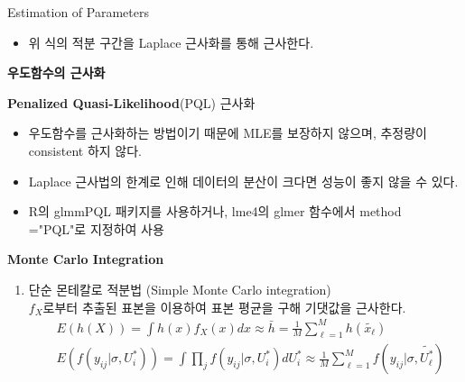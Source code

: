 \documentclass[9pt, xelatex]{beamer}
\begin{document}
{\begin{frame}[allowframebreaks]{Estimation of Parameters}
\begin{itemize}
			여기서 $E(y_{ij}|U_{i})=\mu_{ij}=g^{-1}(X_{ij}\beta+Z_{ij}U_{i})$, 		
			$var(y_{ij}|U_{i})=a_{ij}(\phi)v(\mu_{ij})$일 때 
			
			$\phi$는 산포모수(dispersion parameter), $v(\mu_{ij})$는 알려진 분산 함수라면,
			\vspace{1mm}
			
			\begin{center}
				$d_{ij}=-2\int_{y_{ij}}^{\mu_{ij}}\frac{y_{ij}-u}{a_{ij}(\phi)v(u)}$는 Quasi 분산이다.
			\end{center}
			\vspace{2mm}
			
			\item 위 식의 적분 구간을 Laplace 근사화를 통해 근사한다.
		\end{itemize}
		\framebreak
		\textbf{우도함수의 근사화}
		\vspace{4mm}
		
		\textbf{Penalized Quasi-Likelihood}(PQL) 근사화
		\vspace{2mm}
		
		\begin{itemize}
			\item 우도함수를 근사화하는 방법이기 때문에 MLE를 보장하지 않으며, 추정량이 consistent 하지 않다.
			\vspace{2mm}
			
			\item Laplace 근사법의 한계로 인해 데이터의 분산이 크다면 성능이 좋지 않을 수 있다.
			\vspace{2mm}
			
			\item R의 glmmPQL 패키지를 사용하거나, lme4의 glmer 함수에서 method ="PQL"로 지정하여 사용
			
		\end{itemize}
		\framebreak
	
	\textbf{Monte Carlo Integration} \\
	\vspace{4mm}
	\begin{enumerate}
		\item 단순 몬테칼로 적분법 (Simple Monte Carlo integration) \\
		\vspace{2mm}
		$f_X$로부터 추출된 표본을 이용하여 표본 평균을 구해 기댓값을 근사한다. \\
		\begin{align*}
			& E(h(X)) = \int h(x)f_X(x) dx  \approx \bar{h} = \frac{1}{M}\sum_{\ell=1}^{M}h(\tilde{x_\ell}) \\
			& E(f(y_{ij}\vert \sigma, U_i^*)) = \int \prod_j f(y_{ij}\vert \sigma, U_i^*) dU_i^* 
			\approx	\frac{1}{M}\sum_{\ell=1}^{M}f(y_{ij} \vert \sigma, \tilde{U_{\ell}^*})
		\end{align*}
	

\end{enumerate}
\end{frame}}
\end{document}
